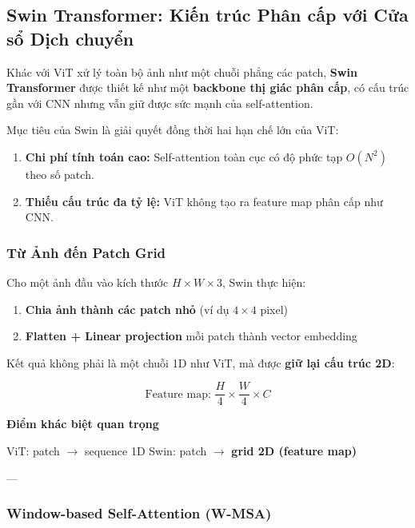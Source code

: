 \subsection{Swin Transformer: Kiến trúc Phân cấp với Cửa sổ Dịch chuyển}
\label{subsec:swin_transformer}

Khác với ViT xử lý toàn bộ ảnh như một chuỗi phẳng các patch, \textbf{Swin Transformer} \cite{Liu2021} được thiết kế như một \textbf{backbone thị giác phân cấp}, có cấu trúc gần với CNN nhưng vẫn giữ được sức mạnh của self-attention.

Mục tiêu của Swin là giải quyết đồng thời hai hạn chế lớn của ViT:
\begin{enumerate}
	\item \textbf{Chi phí tính toán cao:} Self-attention toàn cục có độ phức tạp $O(N^2)$ theo số patch.
	\item \textbf{Thiếu cấu trúc đa tỷ lệ:} ViT không tạo ra feature map phân cấp như CNN.
\end{enumerate}

\subsubsection{Từ Ảnh đến Patch Grid}
\label{subsubsec:swin_patch_representation}

Cho một ảnh đầu vào kích thước $H \times W \times 3$, Swin thực hiện:

\begin{enumerate}
	\item \textbf{Chia ảnh thành các patch nhỏ} (ví dụ $4 \times 4$ pixel)
	\item \textbf{Flatten + Linear projection} mỗi patch thành vector embedding
\end{enumerate}

Kết quả không phải là một chuỗi 1D như ViT, mà được \textbf{giữ lại cấu trúc 2D}:

\[
\text{Feature map: } \frac{H}{4} \times \frac{W}{4} \times C
\]

\begin{mdframed}[style=infobox]
	\textbf{Điểm khác biệt quan trọng}
	
	ViT: patch $\rightarrow$ sequence 1D  
	Swin: patch $\rightarrow$ \textbf{grid 2D (feature map)}
\end{mdframed}

---

\subsubsection{Window-based Self-Attention (W-MSA)}
\label{subsubsec:swin_window_attention}

